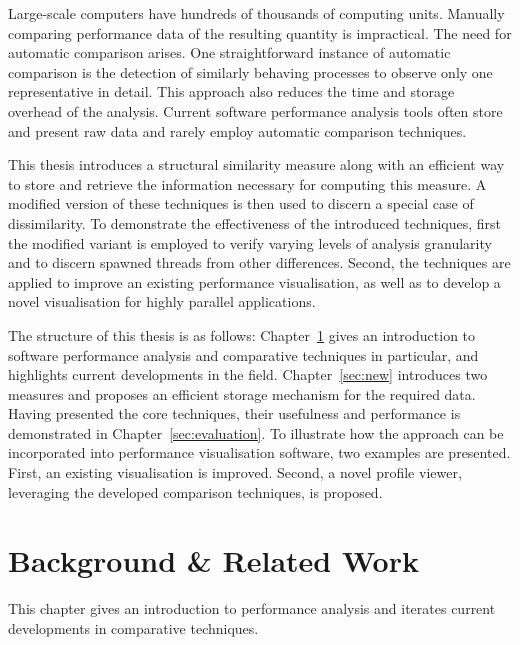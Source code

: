 \documentclass[a4paper, final, diplominf]{zih-template}
\begin{document}
Large-scale computers have hundreds of thousands of computing units.
Manually comparing performance data of the resulting quantity is impractical.
The need for automatic comparison arises.
One straightforward instance of automatic comparison is the detection of similarly behaving processes to observe only one representative in detail.
This approach also reduces the time and storage overhead of the analysis.
Current software performance analysis tools often store and present raw data and rarely employ automatic comparison techniques.

This thesis introduces a structural similarity measure along with an efficient way to store and retrieve the information necessary for computing this measure.
A modified version of these techniques is then used to discern a special case of dissimilarity.
To demonstrate the effectiveness of the introduced techniques, first the modified variant is employed to verify varying levels of analysis granularity and to discern spawned threads from other differences.
Second, the techniques are applied to improve an existing performance visualisation, as well as to develop a novel visualisation for highly parallel applications.

The structure of this thesis is as follows:
Chapter~\ref{sec:background} gives an introduction to software performance analysis and comparative techniques in particular, and highlights current developments in the field.
Chapter~\ref{sec:new} introduces two measures and proposes an efficient storage mechanism for the required data.
Having presented the core techniques, their usefulness and performance is demonstrated in Chapter~\ref{sec:evaluation}.
To illustrate how the approach can be incorporated into performance visualisation software, two examples are presented.
First, an existing visualisation is improved.
Second, a novel profile viewer, leveraging the developed comparison techniques, is proposed.

\chapter{Background \& Related Work}
\label{sec:background}
This chapter gives an introduction to performance analysis and iterates current developments in comparative techniques.

\end{document}
